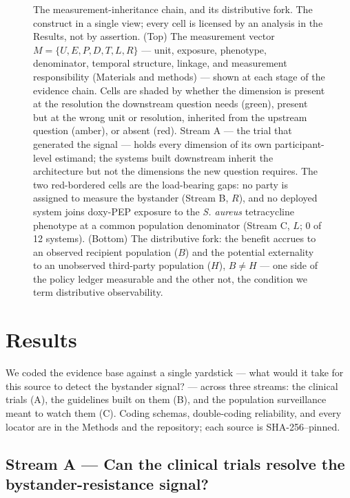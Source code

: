 \documentclass[10pt,letterpaper]{article}
\begin{document}
\begin{figure}[!ht]
\caption{The measurement-inheritance chain, and its distributive fork.
The construct in a single view; every cell is licensed by an analysis in the Results, not by
assertion. (Top) The measurement vector $M = \{U, E, P, D, T, L, R\}$ --- unit, exposure,
phenotype, denominator, temporal structure, linkage, and measurement responsibility (Materials and
methods) --- shown at each stage of the evidence chain. Cells are shaded by whether the dimension is
present at the resolution the downstream question needs (green), present but at the wrong unit
or resolution, inherited from the upstream question (amber), or absent (red). Stream A --- the trial
that generated the signal --- holds every dimension of its own participant-level estimand; the systems
built downstream inherit the architecture but not the dimensions the new question requires. The two
red-bordered cells are the load-bearing gaps: no party is assigned to measure the bystander (Stream B,
$R$), and no deployed system joins doxy-PEP exposure to the \emph{S. aureus} tetracycline phenotype at
a common population denominator (Stream C, $L$; 0 of 12 systems). (Bottom) The distributive
fork: the benefit accrues to an observed recipient population ($B$) and the potential externality to an
unobserved third-party population ($H$), $B \neq H$ --- one side of the policy ledger measurable and
the other not, the condition we term distributive observability.}
\label{fig1}
\end{figure}

\section*{Results}

We coded the evidence base against a single yardstick --- what
would it take for this source to detect the bystander signal? ---
across three streams: the clinical trials (A), the guidelines built on
them (B), and the population surveillance meant to watch them (C).
Coding schemas, double-coding reliability, and every locator are in the
Methods and the repository; each source is SHA-256--pinned.

\subsection*{Stream A --- Can the clinical trials resolve the bystander-resistance signal?}
\end{document}

